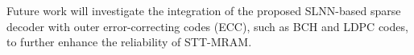 \documentclass[conference]{IEEEtran}
\begin{document}
Future work will investigate the integration of the proposed SLNN-based sparse decoder with outer error-correcting codes (ECC), such as BCH and LDPC codes, to further enhance the reliability of STT-MRAM.














\vspace{12pt}
\end{document}
